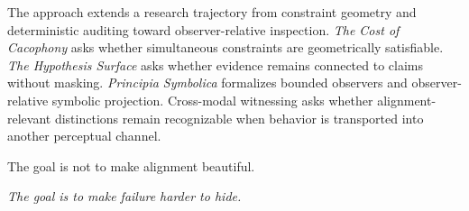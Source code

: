 \documentclass[11pt]{article}
\begin{document}
The approach extends a research trajectory from constraint geometry and deterministic auditing toward observer-relative inspection. \emph{The Cost of Cacophony} asks whether simultaneous constraints are geometrically satisfiable. \emph{The Hypothesis Surface} asks whether evidence remains connected to claims without masking. \emph{Principia Symbolica} formalizes bounded observers and observer-relative symbolic projection. Cross-modal witnessing asks whether alignment-relevant distinctions remain recognizable when behavior is transported into another perceptual channel.

The goal is not to make alignment beautiful.

\begin{center}
\emph{The goal is to make failure harder to hide.}
\end{center}
\end{document}
